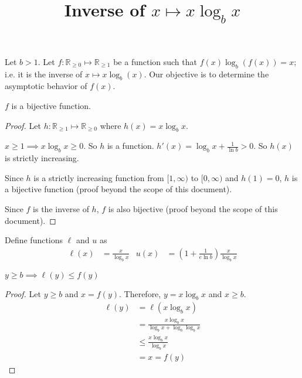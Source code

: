 

\title{Inverse of \texorpdfstring{$x \mapsto x\log_b x$}{x -> x*log_b(x)}}



\maketitle
\initMinimal{}

Let $b > 1$. Let $f: \mathbb{R}_{\ge 0} \mapsto \mathbb{R}_{\ge 1}$ be a function such that
$f(x)\log_b(f(x)) = x$; i.e. it is the inverse of $x \mapsto x\log_b(x)$.
Our objective is to determine the asymptotic behavior of $f(x)$.

\begin{theorem}
$f$ is a bijective function.
\end{theorem}
\begin{proof}
Let $h: \mathbb{R}_{\ge 1} \mapsto \mathbb{R}_{\ge 0}$ where $h(x) = x\log_b x$.

$x \ge 1 \implies x \log_b x \ge 0$. So $h$ is a function.
$h'(x) = \log_b x + \frac{1}{\ln b} > 0$. So $h(x)$ is strictly increasing.

Since $h$ is a strictly increasing function from $[1, \infty)$ to $[0, \infty)$
and $h(1) = 0$, $h$ is a bijective function (proof beyond the scope of this document).

Since $f$ is the inverse of $h$, $f$ is also bijective
(proof beyond the scope of this document).
\end{proof}

Define functions $\ell$ and $u$ as
\begin{align*}
\ell(x) &= \frac{x}{\log_b x}
& u(x) &= \left(1 + \frac{1}{e\ln b}\right)\frac{x}{\log_b x}
\end{align*}

\begin{theorem}
$y \ge b \implies \ell(y) \le f(y)$
\end{theorem}
\begin{proof}
Let $y \ge b$ and $x = f(y)$. Therefore, $y = x\log_b x$ and $x \ge b$.
\begin{align*}
\ell(y) &= \ell(x\log_b x)
\\ &= \frac{x\log_b x}{\log_b x + \log_b\log_b x}
\\ &\le \frac{x\log_b x}{\log_b x}  \tag{$x\log_b x \ge 0$ and $\log_b \log_b x \ge 0$}
\\ &= x = f(y)
\end{align*}
\end{proof}


